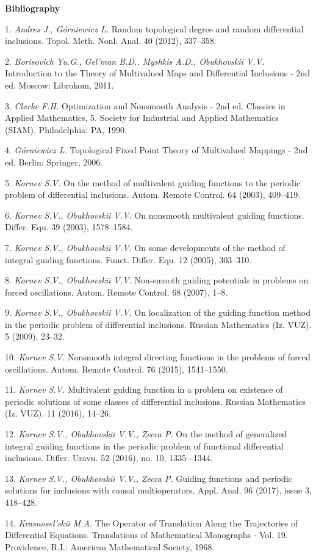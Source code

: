 \smallskip \centerline {\bf Bibliography} \nopagebreak

1. {\it Andres J., G\'orniewicz L.} Random topological degree and random differential inclusions. Topol. Meth. Nonl. Anal. 40 (2012), 337--358.

2. {\it Borisovich Yu.G., Gel'man B.D., Myshkis A.D., Obukho\-vskii V.V.} Introduction to the Theory of Multivalued Maps and Dif\-fe\-ren\-tial Inclusions - 2nd ed. Moscow: Librokom, 2011.

3.  {\it Clarke F.H.} Optimization and Nonsmooth Analysis - 2nd ed. Classics in Applied Mathematics, 5. Society for Industrial and Applied Mathematics (SIAM). Philadelphia: PA, 1990.

4. {\it G\'orniewicz L.}  Topological Fixed Point Theory of Multi\-valued Mappings - 2nd ed. Berlin: Springer, 2006.

5. {\it Kornev S.V.} On the method of multivalent guiding functi\-ons to the periodic problem of differential inclusions. Autom. Re\-mote Control. 64 (2003), 409--419.

6. {\it Kornev S.V., Obukhovskii V.V.} On nonsmooth multiva\-lent guiding functions. Differ. Equ. 39 (2003), 1578--1584.

7. {\it Kornev S.V., Obukhovskii V.V.} On some developments of the method of integral guiding functions. Funct. Differ. Equ. 12 (2005), 303--310.

8. {\it Kornev S.V., Obukhovskii V.V.} Non-smooth guiding po\-tentials in problems on forced oscillations. Autom. Remote Con\-trol. 68 (2007), 1--8.

9. {\it Kornev S.V., Obukhovskii V.V.} On localization of the guiding function method in the periodic problem of differential inclusions. Russian Mathematics (Iz. VUZ). 5 (2009), 23--32.

10. {\it Kornev S.V.} Nonsmooth integral directing functions in the problems of forced oscillations. Autom. Remote Control. 76 (2015), 1541--1550.

11. {\it Kornev S.V.} Multivalent guiding function in a problem on existence of periodic solutions of some classes of differential inclusions. Russian Mathematics (Iz. VUZ). 11 (2016), 14--26.

12. {\it Kornev S.V., Obukhovskii V.V., Zecca P.} On the method of generalized integral guiding functions in the periodic problem of functional differential inclusions. Differ. Uravn. 52 (2016), no. 10, 1335–-1344.

13. {\it Kornev S.V., Obukhovskii V.V., Zecca P.} Guiding func\-ti\-ons and periodic solutions for inclusions with causal multiope\-rators. Appl. Anal. 96 (2017), issue 3, 418--428.

14. {\it Krasnosel'skii M.A.} The Operator of Translation Along the Trajectories of Differential Equations. Translations of Ma\-the\-ma\-tical Monographs - Vol. 19.  Providence, R.I.: American Ma\-the\-matical Society, 1968.

